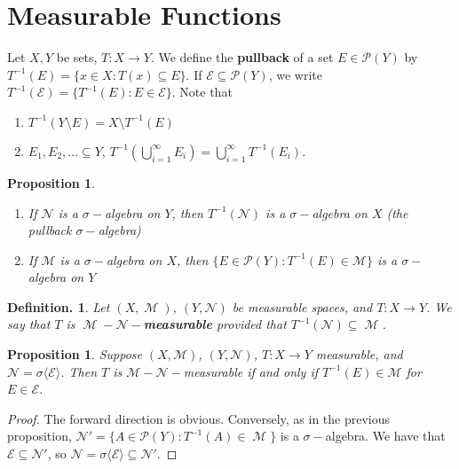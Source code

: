 \documentclass[12pt, a4paper]{memoir}
\newtheorem{proposition}[theorem]{Proposition}
\theoremstyle{nonumberplain}
\newtheorem{definition}{Definition.}
\newtheorem{proof}{Proof}
\DeclareMathOperator{\M}{\mathcal{M}}
\begin{document}
\section{Measurable Functions}
Let $X,Y$ be sets, $T:X\to Y$.
We define the \textbf{pullback} of a set $E\in\mathcal{P}(Y)$ by $T^{-1}(E)=\{x\in X:T(x)\subseteq E\}$.
If $\mathcal{E}\subseteq\mathcal{P}(Y)$, we write $T^{-1}(\mathcal{E})=\{T^{-1}(E):E\in\mathcal{E}\}$.
Note that
\begin{enumerate}
    \item $T^{-1}(Y\setminus E)=X\setminus T^{-1}(E)$
    \item $E_1,E_2,\ldots\subseteq Y$, $T^{-1}\left(\bigcup_{i=1}^\infty E_i\right)=\bigcup_{i=1}^\infty T^{-1}(E_i)$.
\end{enumerate}
\begin{proposition}
    \begin{enumerate}[nolistsep]
        \item If $\mathcal{N}$ is a $\sigma-$algebra on $Y$, then $T^{-1}(\mathcal{N})$ is a $\sigma-$algebra on $X$ (the pullback $\sigma-$algebra)
        \item If $\mathcal{M}$ is a $\sigma-$algebra on $X$, then $\{E\in\mathcal{P}(Y):T^{-1}(E)\in\mathcal{M}\}$ is a $\sigma-$algebra on $Y$
    \end{enumerate}
\end{proposition}
\begin{definition}
    Let $(X,\M)$, $(Y,\mathcal{N})$ be measurable spaces, and $T:X\to Y$.
    We say that $T$ is $\M-\mathcal{N}-$\textbf{measurable} provided that $T^{-1}(\mathcal{N})\subseteq\M$.
\end{definition}
\begin{proposition}
    Suppose $(X,\mathcal{M})$, $(Y,\mathcal{N})$, $T:X\to Y$ measurable, and $\mathcal{N}=\sigma\langle\mathcal{E}\rangle$.
    Then $T$ is $\mathcal{M}-\mathcal{N}-$measurable if and only if $T^{-1}(E)\in\mathcal{M}$ for $E\in\mathcal{E}$.
\end{proposition}
\begin{proof}
    The forward direction is obvious.
    Conversely, as in the previous proposition, $\mathcal{N}'=\{A\in\mathcal{P}(Y):T^{-1}(A)\in\M\}$ is a $\sigma-$algebra.
    We have that $\mathcal{E}\subseteq\mathcal{N}'$, so $\mathcal{N}=\sigma\langle\mathcal{E}\rangle\subseteq\mathcal{N}'$.
\end{proof}
\end{document}
